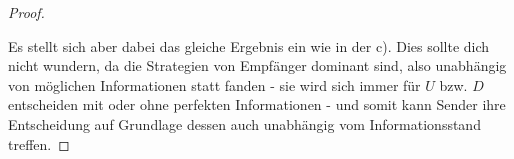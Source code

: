 \documentclass[12pt]{article}
\begin{document}
\begin{enumerate}[label=\alph*\upshape)]
\begin{proof}
\begin{figure}[h!]
\end{figure}

			Es stellt sich aber dabei das gleiche Ergebnis ein wie in der c). Dies sollte dich nicht wundern, da die Strategien von Empfänger dominant sind, also unabhängig von möglichen Informationen statt fanden - sie wird sich immer für $U$ bzw. $D$ entscheiden mit oder ohne perfekten Informationen - und somit kann Sender ihre Entscheidung auf Grundlage dessen auch unabhängig vom Informationsstand treffen.
		\end{proof}
\end{enumerate}
\end{document}
